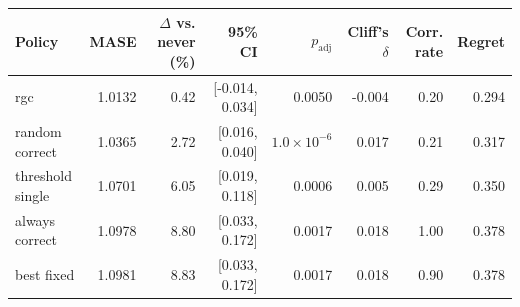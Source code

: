 \begin{tabular}{lrrrrrrr}
\toprule
Policy & MASE & $\Delta$ vs. never (\%) & 95\% CI & $p_{\text{adj}}$ & Cliff's $\delta$ & Corr. rate & Regret \\
\midrule
rgc & 1.0132 & 0.42 & [-0.014, 0.034] & 0.0050 & -0.004 & 0.20 & 0.294 \\
random correct & 1.0365 & 2.72 & [0.016, 0.040] & $1.0 \times 10^{-6}$ & 0.017 & 0.21 & 0.317 \\
threshold single & 1.0701 & 6.05 & [0.019, 0.118] & 0.0006 & 0.005 & 0.29 & 0.350 \\
always correct & 1.0978 & 8.80 & [0.033, 0.172] & 0.0017 & 0.018 & 1.00 & 0.378 \\
best fixed & 1.0981 & 8.83 & [0.033, 0.172] & 0.0017 & 0.018 & 0.90 & 0.378 \\
\bottomrule
\end{tabular}
